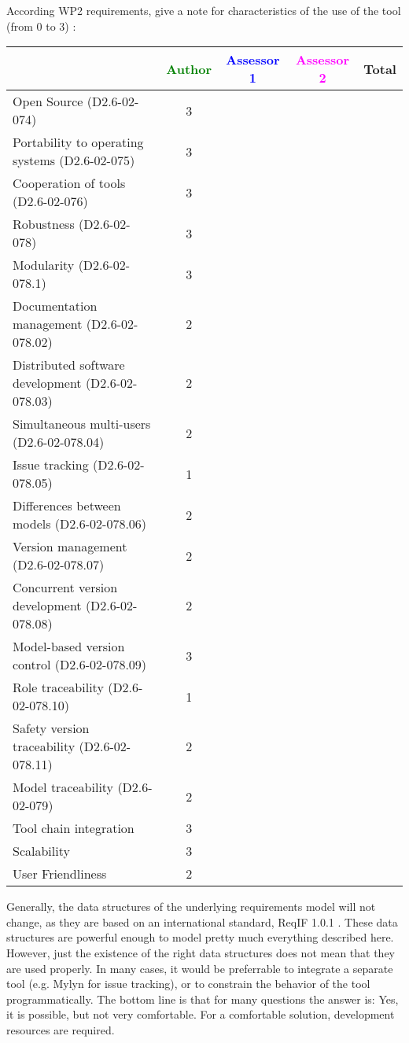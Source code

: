 According WP2 requirements, give a note for characteristics of the use of the tool (from 0 to 3) :

\begin{tabular}{|l | c | c | c | c|}
\hline
& \textcolor{green}{Author} & \textcolor{blue}{Assessor 1} & \textcolor{magenta}{Assessor 2} & Total \\
\hline 
Open Source (D2.6-02-074) & 3 & & &  \\
\hline 
Portability to operating systems (D2.6-02-075) & 3 & & &  \\
\hline
Cooperation of tools (D2.6-02-076) & 3 & & &  \\
\hline
Robustness (D2.6-02-078) & 3 & & & \\
\hline
Modularity (D2.6-02-078.1) & 3 & & & \\
\hline
Documentation management (D2.6-02-078.02) & 2 & & & \\
\hline
Distributed software development (D2.6-02-078.03)  & 2 & & & \\
\hline
Simultaneous multi-users (D2.6-02-078.04)   & 2 & & & \\
\hline
Issue tracking (D2.6-02-078.05) & 1 & & & \\
\hline
Differences between models (D2.6-02-078.06) & 2 & & & \\
\hline
Version management (D2.6-02-078.07) & 2 & & & \\
\hline
Concurrent version development (D2.6-02-078.08) & 2 & & & \\
\hline
Model-based version control (D2.6-02-078.09) & 3 & & & \\
\hline
Role traceability (D2.6-02-078.10) & 1 & & & \\
\hline
Safety version traceability (D2.6-02-078.11) & 2 & & & \\
\hline
Model traceability (D2.6-02-079) & 2 & & & \\
\hline
Tool chain integration & 3 & & & \\
\hline
Scalability & 3 & & & \\
\hline
User Friendliness & 2 & & & \\
\hline
\end{tabular}

\begin{author_comment}
Generally, the data structures of the underlying requirements model will not change, as they are based on an international standard, ReqIF 1.0.1 \cite{omg_requirements_2011}.  These data structures are powerful enough to model pretty much everything described here.  However, just the existence of the right data structures does not mean that they are used properly.  In many cases, it would be preferrable to integrate a separate tool (e.g. Mylyn for issue tracking), or to constrain the behavior of the tool programmatically.  The bottom line is that for many questions the answer is: Yes, it is possible, but not very comfortable.  For a comfortable solution, development resources are required.

\end{author_comment}

